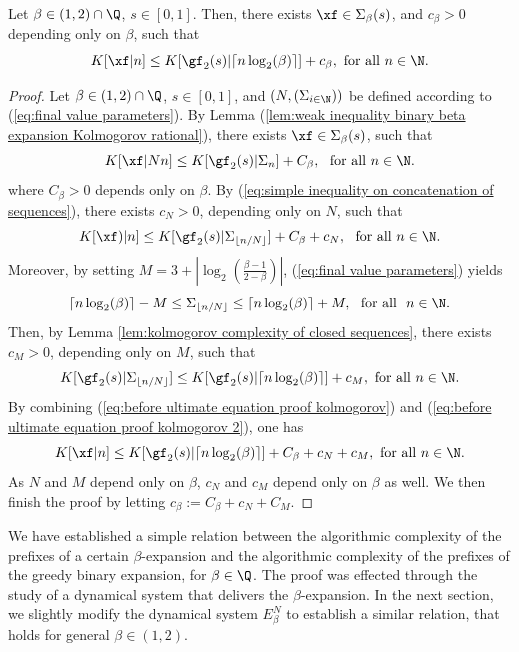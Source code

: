 \begin{corollary}
	Let $\beta \in (1,2)\cap \Q$, $s \in [0,1]$. Then, there exists $\xf \in \Sigma_\beta(s)$, and $c_\beta > 0$ depending only on $\beta$, such that
	\begin{equation}\label{eq:algorithmic complexity of beta expansion lower than binary expansion}
		K[\xf|n] \leq K[\gf_2(s)|\lceil n \log_2(\beta)\rceil] + c_\beta, \ \text{for all} \ n \in \N.
	\end{equation}
\end{corollary}
\begin{proof}
	Let $\beta \in (1,2)\cap \Q$, $s \in [0,1]$, and $(N,(\Sigma_{i \in \N}))$ be defined according to (\ref{eq:final value parameters}). By Lemma (\ref{lem:weak inequality binary beta expansion Kolmogorov rational}), there exists $\xf \in \Sigma_\beta(s)$, such that 
	\begin{equation}
		K[\xf|N n] \leq K[\gf_2(s)|\Sigma_n] + C_\beta, \ \ \text{for all} \ n \in \N.
	\end{equation}
	where $C_\beta > 0$ depends only on $\beta$. By (\ref{eq:simple inequality on concatenation of sequences}), there exists $c_N>0$, depending only on $N$, such that
\begin{equation}\label{eq:before ultimate equation proof kolmogorov}
	K[\xf)|n]  \leq K[\gf_2(s)|\Sigma_{\lfloor n/N\rfloor}] + C_\beta + c_N, \ \ \text{for all} \ n \in \N.
\end{equation}
Moreover, by setting $M = 3 + \left| \log_2\left(\frac{\beta - 1}{2 - \beta}\right)\right|$, (\ref{eq:final value parameters}) yields
\begin{equation}
	\lceil n \log_2(\beta) \rceil - M \leq\Sigma_{\lfloor n/N\rfloor} \leq \lceil n \log_2(\beta) \rceil + M, \ \text{ for all } \ n \in \N.
\end{equation}
Then, by Lemma \ref{lem:kolmogorov complexity of closed sequences}, there exists $c_M > 0$, depending only on $M$, such that
\begin{equation}\label{eq:before ultimate equation proof kolmogorov 2}
	K[\gf_2(s)|\Sigma_{\lfloor n/N\rfloor}] \leq K[\gf_2(s)|\lceil n \log_2(\beta) \rceil] + c_M, \ \text{for all} \ n \in \N.
\end{equation}
By combining (\ref{eq:before ultimate equation proof kolmogorov}) and (\ref{eq:before ultimate equation proof kolmogorov 2}), one has
\begin{equation}
	K[\xf|n] \leq K[\gf_2(s)|\lceil n \log_2(\beta) \rceil] + C_\beta + c_N + c_M, \ \text{for all} \ n \in \N.
\end{equation}
As $N$ and $M$ depend only on $\beta$, $c_N$ and $c_M$ depend only on $\beta$ as well. We then finish the proof by letting $c_\beta := C_\beta + c_N + C_M$.
\end{proof}
We have established a simple relation between the algorithmic complexity of the prefixes of a certain $\beta$-expansion and the algorithmic complexity of the prefixes of the greedy binary expansion, for $\beta\in \Q$. The proof was effected through the study of a dynamical system that delivers the $\beta$-expansion. In the next section, we slightly modify the dynamical system $E_\beta^N$ to establish a similar relation, that holds for general $\beta \in (1,2)$.